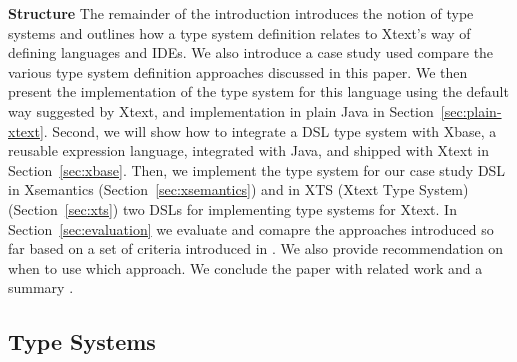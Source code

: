 \textbf{Structure} The remainder of the introduction introduces the notion of
type systems and outlines how a type system definition relates to Xtext's way of
defining languages and IDEs. We also introduce a case study used compare the
various type system definition approaches discussed in this paper. We then
present the implementation of the type system for this language using the
default way suggested by Xtext, and implementation in plain Java 
in Section~\ref{sec:plain-xtext}. Second, we will show how to integrate a DSL
type system with Xbase, a reusable expression language, integrated
with Java, and shipped with Xtext in Section~\ref{sec:xbase}. Then, we implement
the type system for our case study DSL in Xsemantics (Section~\ref{sec:xsemantics}) and 
in XTS (Xtext Type System) (Section~\ref{sec:xts}) two DSLs for implementing type
systems for Xtext. In Section~\ref{sec:evaluation} we evaluate and comapre
the approaches introduced so far based on a set of criteria introduced in
. We also provide recommendation on when to use which approach. We
conclude the paper with related work  and a summary .


\subsection{Type Systems}






\endinput


Developing a compiler for a language \mv{It is not just the compiler. The whole
language definition must also be defined.} and its integration in Eclipse is
usually time consuming since it requires many phases, starting from parsing the
program, checking that is correct, up to the generation. Furthermore, these
mechanisms have to be integrated in the Eclipse IDE, which, in turn requires
more manual programming in order to provide background parsing of the program,
error marker generation, and all the tooling mechanisms to give the programmer a
good experience\mv{what is a good experience?}.  Xtext~\cite{xtext} is a
framework for language development based on Eclipse. It has successfully been
used for developing domain-specific languages (DSLs) as well as general-purpose
programming languages. It provides high-level mechanisms that significantly
simplify the development of the artifacts necessary for a fully-fledged IDE on
top of Eclipse.

